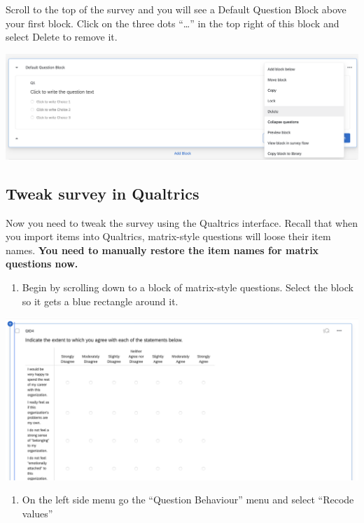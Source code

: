 \documentclass[
]{krantz}
\providecommand{\tightlist}{%
  \setlength{\itemsep}{0pt}\setlength{\parskip}{0pt}}
\begin{document}
Scroll to the top of the survey and you will see a Default Question Block above your first block. Click on the three dots ``\ldots{}'' in the top right of this block and select Delete to remove it.

\includegraphics[width=0.9\linewidth]{ch_qualtrics/images/screenshot_empty_block}

\hypertarget{tweak-survey-in-qualtrics}{%
\subsection{Tweak survey in Qualtrics}\label{tweak-survey-in-qualtrics}}

Now you need to tweak the survey using the Qualtrics interface. Recall that when you import items into Qualtrics, matrix-style questions will loose their item names. \textbf{You need to manually restore the item names for matrix questions now.}

\begin{enumerate}
\def\labelenumi{\arabic{enumi}.}
\tightlist
\item
  Begin by scrolling down to a block of matrix-style questions. Select the block so it gets a blue rectangle around it.
\end{enumerate}

\includegraphics[width=1\linewidth]{ch_qualtrics/images/screenshot_exporttag_select}

\begin{enumerate}
\def\labelenumi{\arabic{enumi}.}
\setcounter{enumi}{1}
\tightlist
\item
  On the left side menu go the ``Question Behaviour'' menu and select ``Recode values''
\end{enumerate}
\end{document}
